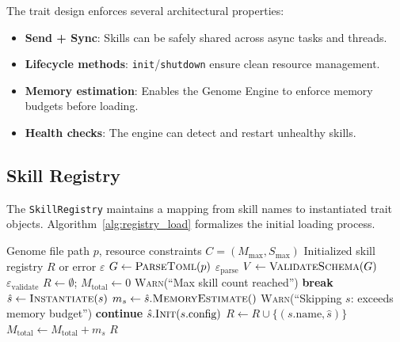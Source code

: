 \documentclass{article}
\begin{document}
The trait design enforces several architectural properties:
\begin{itemize}[leftmargin=*]
    \item \textbf{Send + Sync}: Skills can be safely shared across async tasks and threads.
    \item \textbf{Lifecycle methods}: \texttt{init}/\texttt{shutdown} ensure clean resource management.
    \item \textbf{Memory estimation}: Enables the Genome Engine to enforce memory budgets before loading.
    \item \textbf{Health checks}: The engine can detect and restart unhealthy skills.
\end{itemize}


\subsection{Skill Registry}

The \texttt{SkillRegistry} maintains a mapping from skill names to instantiated trait objects. Algorithm~\ref{alg:registry_load} formalizes the initial loading process.

\begin{algorithm}[t]
\caption{Genome Loading and Skill Registry Initialization}
\label{alg:registry_load}
\begin{algorithmic}[1]
\REQUIRE Genome file path $p$, resource constraints $C = (M_{\max}, S_{\max})$
\ENSURE Initialized skill registry $R$ or error $\varepsilon$
\STATE $G \leftarrow \textsc{ParseToml}(p)$ 
    \RETURN $\varepsilon_{\text{parse}}$
\ENDIF
\STATE $V \leftarrow \textsc{ValidateSchema}(G)$ 
    \RETURN $\varepsilon_{\text{validate}}$
\ENDIF
\STATE $R \leftarrow \emptyset$; $M_{\text{total}} \leftarrow 0$
        \STATE \textsc{Warn}(``Max skill count reached'')
        \STATE \textbf{break}
    \ENDIF
    \STATE $\hat{s} \leftarrow \textsc{Instantiate}(s)$ 
    \STATE $m_s \leftarrow \hat{s}.\textsc{MemoryEstimate}()$
        \STATE \textsc{Warn}(``Skipping $s$: exceeds memory budget'')
        \STATE \textbf{continue}
    \ENDIF
    \STATE $\hat{s}.\textsc{Init}(s.\text{config})$ 
    \STATE $R \leftarrow R \cup \{(s.\text{name}, \hat{s})\}$
    \STATE $M_{\text{total}} \leftarrow M_{\text{total}} + m_s$
\ENDFOR
\RETURN $R$
\end{algorithmic}
\end{algorithm}
\end{document}
